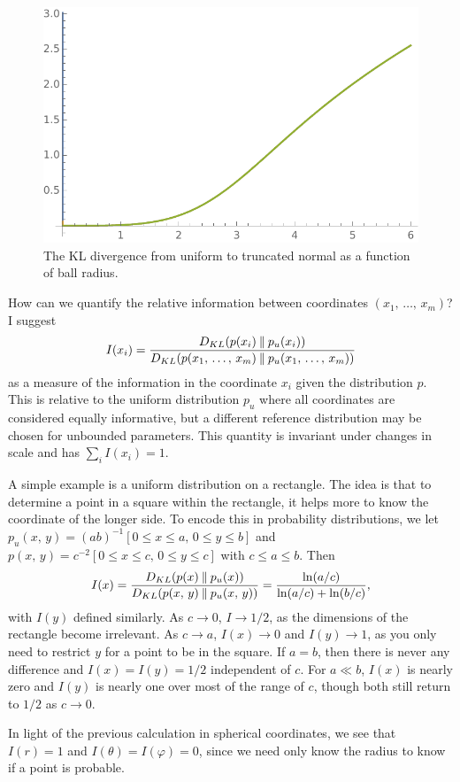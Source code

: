 \documentclass[../notebook.tex]{subfiles}
\begin{document}
\begin{figure}[h]
  \centering
  \includegraphics[width=0.9\linewidth]{trunc-norm-ball-kldiv}
  \caption{The KL divergence from uniform to truncated normal as a function of
  ball radius.}\label{fig:trunc-norm-ball-kldiv}
\end{figure}

How can we quantify the relative information between coordinates $(x_1,\,
\ldots,\, x_m)$? I suggest
\[
  I(x_i)
  = \frac{D_{KL}(p(x_i) \mathbin\| p_u(x_i))}{%
  D_{KL}(p(x_1,\, \ldots,\, x_m) \mathbin\| p_u(x_1,\, \ldots,\, x_m))}
\]
as a measure of the information in the coordinate $x_i$ given the distribution
$p$. This is relative to the uniform distribution $p_u$ where all coordinates
are considered equally informative, but a different reference distribution may
be chosen for unbounded parameters. This quantity is invariant under changes in
scale and has $\sum_i I(x_i) = 1$.

A simple example is a uniform distribution on a rectangle. The idea is that to
determine a point in a square within the rectangle, it helps more to know the
coordinate of the longer side. To encode this in probability distributions, we
let $p_u(x,\, y) = {(ab)}^{-1} [0 \le x \le a,\, 0 \le y \le b]$ and $p(x,\, y)
= c^{-2} [0 \le x \le c,\, 0 \le y \le c]$ with $c \le a \le b$. Then
\[
  I(x)
  = \frac{D_{KL}(p(x) \mathbin\| p_u(x))}{%
  D_{KL}(p(x,\, y) \mathbin\| p_u(x,\, y))}
  = \frac{\ln(a/c)}{\ln(a/c) + \ln(b/c)},
\]
with $I(y)$ defined similarly. As $c \to 0$, $I \to 1/2$, as the dimensions of
the rectangle become irrelevant. As $c \to a$, $I(x) \to 0$ and $I(y) \to 1$, as
you only need to restrict $y$ for a point to be in the square. If $a = b$, then
there is never any difference and $I(x) = I(y) = 1/2$ independent of $c$. For $a
\ll b$, $I(x)$ is nearly zero and $I(y)$ is nearly one over most of the range of
$c$, though both still return to $1/2$ as $c \to 0$.

In light of the previous calculation in spherical coordinates, we see that $I(r)
= 1$ and $I(\theta) = I(\varphi) = 0$, since we need only know the radius to
know if a point is probable.
\end{document}
